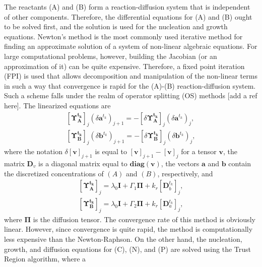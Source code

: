 \documentclass[aps,preprint]{revtex4}
\begin{document}
The reactants (A) and (B) form a reaction-diffusion system that is independent
of other components. Therefore, the differential equations for (A) and (B)
ought to be solved first, and the solution is used for the nucleation and
growth equations. Newton's method is the most commonly used iterative method
for finding an approximate solution of a system of non-linear algebraic
equations. For large computational problems, however, building the Jacobian
(or an approximation of it) can be quite expensive. Therefore, a fixed point
iteration (FPI) is used that allows decomposition and manipulation of the
non-linear terms in such a way that convergence is rapid for the (A)-(B)
reaction-diffusion system. Such a scheme falls under the realm of operator
splitting (OS) methods [add a ref here]. The linearized equations are
\begin{align}
\left[  \mathbf{\Upsilon_{A}^{t _{k}}}\right]  _{j}\left(  \delta\mathbf{a}^{t
_{k}} \right)  _{j+1}=-\left[  \delta\mathbf{\Upsilon_{A}^{t _{k}}}\right]
_{j}\left(  \delta\mathbf{a}^{t _{k}} \right)  _{j},\\
\left[  \mathbf{\Upsilon_{B}^{t _{k}}}\right]  _{j}\left(  \delta\mathbf{b}^{t
_{k}} \right)  _{j+1}=-\left[  \delta\mathbf{\Upsilon_{B}^{t _{k}}}\right]
_{j}\left(  \delta\mathbf{b}^{t _{k}} \right)  _{j},
\end{align}
where the notation $\delta\left[  \mathbf{v}\right]  _{j+1}$ is equal to
$\left[  \mathbf{v}\right]  _{j+1}-\left[  \mathbf{v}\right]  _{j}$ for a
tensor $\mathbf{v}$, the matrix $\mathbf{D}_{v}$ is a diagonal matrix equal to
$\mathbf{diag}\left(  \mathbf{v}\right)  $, the vectors $\mathbf{a}$ and
$\mathbf{b}$ contain the discretized concentrations of $(A)$ and $(B)$,
respectively, and
\begin{align}
\left[ \mathbf{\Upsilon_{A}^{t _{k}}}\right]  _{j} = \lambda_{0}
\mathbf{I+}{\Gamma}_{1}\mathbf{\Pi+}{k}_{r} \left[  \mathbf{D}_{b}^{t _{k}
}\right]  _{j},\label{RD_OPA}\\
\left[ \mathbf{\Upsilon_{B}^{t _{k}}}\right]  _{j} = \lambda_{0}
\mathbf{I+}{\Gamma}_{2}\mathbf{\Pi+}{k}_{r}\left[  \mathbf{D}_{a}^{t _{k}
}\right]  _{j}, \label{RD_OPB}
\end{align}
where $\mathbf{\Pi}$ is the diffusion tensor. The convergence rate of this
method is obviously linear. However, since convergence is quite rapid, the
method is computationally less expensive than the Newton-Raphson. On the other
hand, the nucleation, growth, and diffusion equations for (C), (N), and (P)
are solved using the Trust Region \cite{Optimization} algorithm, where a
\end{document}
